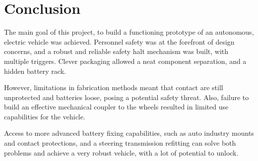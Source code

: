 \documentclass[journal]{IEEEtran}
\begin{document}



\section{Conclusion}

The main goal of this project, to build a functioning prototype of an autonomous, electric vehicle was achieved. Personnel safety was at the forefront of design concerns, and a robust and reliable safety halt mechanism was built, with multiple triggers. Clever packaging allowed a neat component separation, and a hidden battery rack.

However, limitations in fabrication methods meant that contact are still unprotected and batteries loose, posing a potential safety threat. Also, failure to build an effective mechanical coupler to the wheels resulted in limited use capabilities for the vehicle.

Access to more advanced battery fixing capabilities, such as auto industry mounts and contact protections, and a steering transmission refitting can solve both problems and achieve a very robust vehicle, with a lot of potential to unlock.






%
\end{document}
